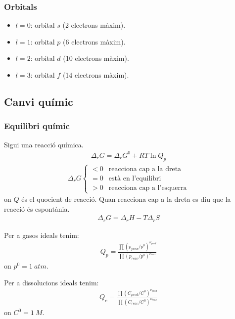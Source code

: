 \subsubsection*{Orbitals}
\begin{itemize}
    \item $l=0$: orbital $s$ (2 electrons màxim).
    \item $l=1$: orbital $p$ (6 electrons màxim). 
    \item $l=2$: orbital $d$ (10 electrons màxim).
    \item $l=3$: orbital $f$ (14 electrons màxim).
\end{itemize}
\newpage

\subsection{Canvi químic}
\subsubsection*{Equilibri químic}
Sigui  una reacció química.
\begin{align}
    \Delta_{r} G = \Delta_{r} G^{0} + RT \ln Q_{p}
\end{align}
\begin{align*}
    \Delta_{r} G   \begin{cases} < 0 & \text{reacciona cap a la dreta} \\ = 0 & \text{està en l'equilibri} \\ > 0 & \text{reacciona cap a l'esquerra} \end{cases}
\end{align*}
on $Q$ és el quocient de reacció. Quan reacciona cap a la dreta es diu que la reacció és espontània.
\begin{align}
    \Delta_{r} G = \Delta_{r} H - T \Delta_{r} S
\end{align}

Per a gasos ideals tenim:    
\begin{align}
    Q_{p} = \frac{\prod (p_{prod}/ p^{0})^{\nu_{prod}}}{\prod (p_{reac}/ p^{0})^{\nu_{reac}}}
\end{align}
on $p^{0} = \SI{1}{atm}$. 

Per a dissolucions ideals tenim:
\begin{align}
    Q_{c} = \frac{\prod (C_{prod}/C^{0})^{\nu_{prod}}}{\prod (C_{reac}/ C^{0})^{\nu_{reac}}}
\end{align}
on $C^{0} = \SI{1}{M}$.

